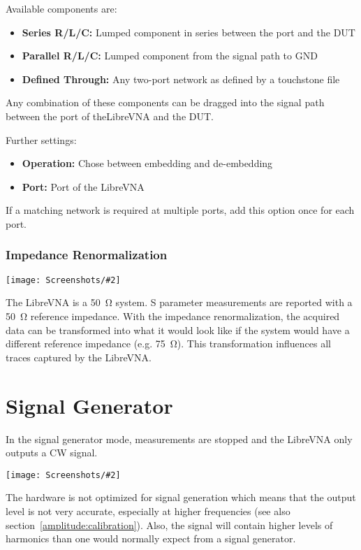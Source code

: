\documentclass[a4paper,11pt]{article}
\newcommand{\vna}{LibreVNA}
\newcommand{\screenshot}[2]{\begin{center}
\texttt{[image: Screenshots/\#2]}
\end{center}}
\begin{document}
Available components are:
\begin{itemize}
\item \textbf{Series R/L/C:} Lumped component in series between the port and the DUT
\item \textbf{Parallel R/L/C:} Lumped component from the signal path to GND
\item \textbf{Defined Through:} Any two-port network as defined by a touchstone file
\end{itemize}
Any combination of these components can be dragged into the signal path between the port of the\vna{} and the DUT.

Further settings:
\begin{itemize}
\item \textbf{Operation:} Chose between embedding and de-embedding
\item \textbf{Port:} Port of the \vna{}
\end{itemize}
If a matching network is required at multiple ports, add this option once for each port.

\subsubsection{Impedance Renormalization}
\screenshot{0.4}{DeembeddingImpedanceRenormalization.png}
The \vna{} is a \SI{50}{\ohm} system. S parameter measurements are reported with a \SI{50}{\ohm} reference impedance. With the impedance renormalization, the acquired data can be transformed into what it would look like if the system would have a different reference impedance (e.g. \SI{75}{\ohm}). This transformation influences all traces captured by the \vna{}.


\section{Signal Generator}
In the signal generator mode, measurements are stopped and the \vna{} only outputs a CW signal.
\screenshot{0.8}{Signalgenerator.png}
The hardware is not optimized for signal generation which means that the output level is not very accurate, especially at higher frequencies (see also section~\ref{amplitude:calibration}). Also, the signal will contain higher levels of harmonics than one would normally expect from a signal generator.
\end{document}
